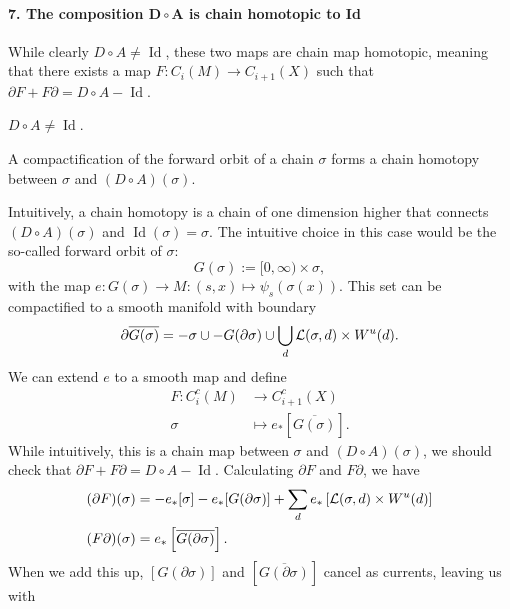 \begin{myproof}
\paragraph{7. The composition $\bm{D  \circ A}$ is chain homotopic to Id}
While clearly $D  \circ  A \neq \operatorname{Id}$, these two maps are chain map homotopic, meaning that there exists a map $F: C_i(M) \to  C_{i+1}(X)$ such that $\partial F + F \partial = D  \circ  A - \operatorname{Id}$.
\begin{marginfigure}
    \centering
    \caption{$D  \circ  A \neq  \operatorname{Id}$.}
    \label{fig:d-na-a-is-not-identity}
\end{marginfigure}
\begin{marginfigure}
    \centering
    \caption{A compactification of the forward orbit of a chain $\sigma$ forms a chain homotopy between $\sigma$ and  $(D  \circ  A)(\sigma)$.}
    \label{fig:chain-homotopy-between-d-na-a-and-id}
\end{marginfigure}
Intuitively, a chain homotopy is a chain of one dimension higher that connects $(D  \circ  A)(\sigma)$ and $\operatorname{Id} (\sigma) = \sigma$.
The intuitive choice in this case would be the so-called forward orbit of $\sigma$:
\[
    G(\sigma) := [0, \infty) \times \sigma
,\] with the map $e: G(\sigma) \to  M: (s, x) \mapsto \psi_s (\sigma(x))$.
This set can be compactified to a smooth manifold with boundary
\[
    \partial \overline{G(\sigma)} = - \sigma \cup - G(\partial \sigma) \cup \bigcup_{d}  \mathcal L(\sigma, d) \times W^u(d)
.\] 
We can extend $e$ to a smooth map and define 
\begin{align*}
    F: C_i^{c}(M) &\longrightarrow C_{i+1}^{c}(X) \\
    \sigma &\longmapsto e_* \left[ \overline{G(\sigma)} \right] 
.\end{align*}
While intuitively, this is a chain map between $\sigma$ and  $(D  \circ A)(\sigma)$, we should check that $\partial F + F \partial = D  \circ  A - \operatorname{Id}$.
Calculating $\partial F$ and  $F \partial$, we have
\begin{align*}
    (\partial F)(\sigma) &= -e_*[\sigma] - e_*[G(\partial \sigma)] + \sum_{d} e_*\left[\mathcal L(\sigma, d) \times W^u(d)\right]\\
    (F \partial)(\sigma) &= e_*\left[\overline{G(\partial \sigma)}\right]
    .\end{align*}
    When we add this up, $[G (\partial \sigma)]$ and $\left[ \overline{G(\partial \sigma)} \right]$ cancel as currents, leaving us with


\end{myproof}
